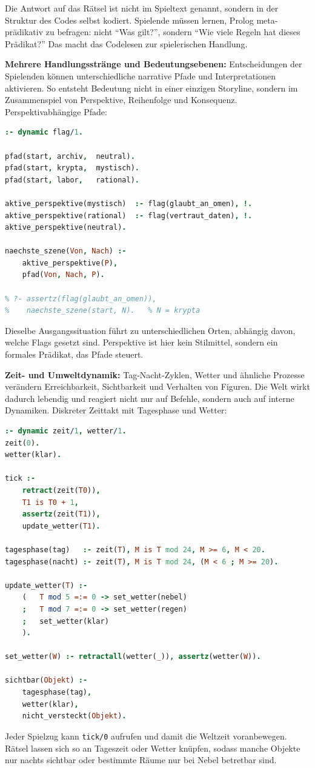 \documentclass[parskip=half,a4paper,11pt]{scrreprt}
\begin{document}
Die Antwort auf das Rätsel ist nicht im Spieltext genannt, sondern in der Struktur des Codes selbst kodiert. Spielende müssen lernen, Prolog meta-prädikativ zu befragen: nicht \enquote{Was gilt?}, sondern \enquote{Wie viele Regeln hat dieses Prädikat?} Das macht das Codelesen zur spielerischen Handlung.

\textbf{Mehrere Handlungsstränge und Bedeutungsebenen:} Entscheidungen der Spielenden können unterschiedliche narrative Pfade und Interpretationen aktivieren. So entsteht Bedeutung nicht in einer einzigen Storyline, sondern im Zusammenspiel von Perspektive, Reihenfolge und Konsequenz. Perspektivabhängige Pfade:

\begin{lstlisting}[language=Prolog,caption={}]
:- dynamic flag/1.

pfad(start, archiv,  neutral).
pfad(start, krypta,  mystisch).
pfad(start, labor,   rational).

aktive_perspektive(mystisch)  :- flag(glaubt_an_omen), !.
aktive_perspektive(rational)  :- flag(vertraut_daten), !.
aktive_perspektive(neutral).

naechste_szene(Von, Nach) :-
    aktive_perspektive(P),
    pfad(Von, Nach, P).

% ?- assertz(flag(glaubt_an_omen)),
%    naechste_szene(start, N).   % N = krypta
\end{lstlisting}

Dieselbe Ausgangssituation führt zu unterschiedlichen Orten, abhängig davon, welche Flags gesetzt sind. Perspektive ist hier kein Stilmittel, sondern ein formales Prädikat, das Pfade steuert.

\textbf{Zeit- und Umweltdynamik:} Tag-Nacht-Zyklen, Wetter und ähnliche Prozesse verändern Erreichbarkeit, Sichtbarkeit und Verhalten von Figuren. Die Welt wirkt dadurch lebendig und reagiert nicht nur auf Befehle, sondern auch auf interne Dynamiken. Diskreter Zeittakt mit Tagesphase und Wetter:

\begin{lstlisting}[language=Prolog,caption={}]
:- dynamic zeit/1, wetter/1.
zeit(0).
wetter(klar).

tick :-
    retract(zeit(T0)),
    T1 is T0 + 1,
    assertz(zeit(T1)),
    update_wetter(T1).

tagesphase(tag)   :- zeit(T), M is T mod 24, M >= 6, M < 20.
tagesphase(nacht) :- zeit(T), M is T mod 24, (M < 6 ; M >= 20).

update_wetter(T) :-
    (   T mod 5 =:= 0 -> set_wetter(nebel)
    ;   T mod 7 =:= 0 -> set_wetter(regen)
    ;   set_wetter(klar)
    ).

set_wetter(W) :- retractall(wetter(_)), assertz(wetter(W)).

sichtbar(Objekt) :-
    tagesphase(tag),
    wetter(klar),
    nicht_versteckt(Objekt).
\end{lstlisting}
Jeder Spielzug kann \texttt{tick/0} aufrufen und damit die Weltzeit voranbewegen. Rätsel lassen sich so an Tageszeit oder Wetter knüpfen, sodass manche Objekte nur nachts sichtbar oder bestimmte Räume nur bei Nebel betretbar sind.
\end{document}
